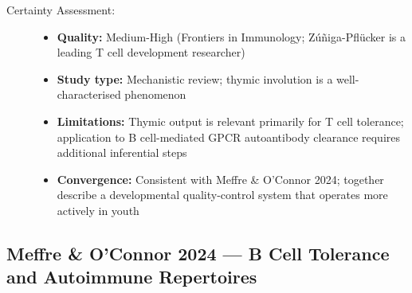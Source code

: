\begin{description}
    \item[Certainty Assessment:]
    \begin{itemize}
        \item \textbf{Quality:} Medium-High (Frontiers in Immunology; Zúñiga-Pflücker is a leading T cell development researcher)
        \item \textbf{Study type:} Mechanistic review; thymic involution is a well-characterised phenomenon
        \item \textbf{Limitations:} Thymic output is relevant primarily for T cell tolerance; application to B cell-mediated GPCR autoantibody clearance requires additional inferential steps
        \item \textbf{Convergence:} Consistent with Meffre \& O'Connor 2024; together describe a developmental quality-control system that operates more actively in youth
    \end{itemize}
\end{description}

\subsection{Meffre \& O'Connor 2024 --- B Cell Tolerance and Autoimmune Repertoires}

